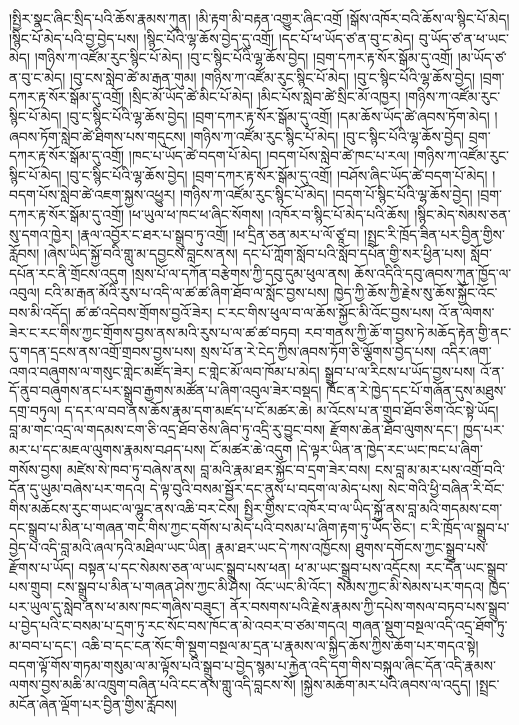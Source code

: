 \documentclass{article}
\begin{document}
།སྤྱིར་སྣང་ཞིང་སྲིད་པའི་ཆོས་རྣམས་ཀུན། །མི་རྟག་མི་བརྟན་འགྱུར་ཞིང་འགྲོ །སྒོས་འཁོར་བའི་ཆོས་ལ་སྙིང་པོ་མེད། །སྙིང་པོ་མེད་པའི་བྱ་བྱེད་པས། །སྙིང་པོའི་ལྷ་ཆོས་བྱེད་དུ་འགྲོ། །དང་པོ་ཕ་ཡོད་ཙ་ན་བུ་ང་མེད། བུ་ཡོད་ཙ་ན་ཕ་ཡང་མེད། །གཉིས་ཀ་འཛོམ་རུང་སྙིང་པོ་མེད། །བུ་ང་སྙིང་པོའི་ལྷ་ཆོས་བྱེད། །བྲག་དཀར་རྟ་སོར་སྒོམ་དུ་འགྲོ། །མ་ཡོད་ཙ་ན་བུ་ང་མེད། །བུ་ངས་སླེབ་ཚེ་མ་རྒན་གུམ། །གཉིས་ཀ་འཛོམ་རུང་སྙིང་པོ་མེད། །བུ་ང་སྙིང་པོའི་ལྷ་ཆོས་བྱེད། །བྲག་དཀར་རྟ་སོར་སྒོམ་དུ་འགྲོ། །སྲིང་མོ་ཡོད་ཚེ་མིང་པོ་མེད། །མིང་པོས་སླེབ་ཚེ་སྲིང་མོ་འཁྱར། །གཉིས་ཀ་འཛོམ་རུང་སྙིང་པོ་མེད། །བུ་ང་སྙིང་པོའི་ལྷ་ཆོས་བྱེད། །བྲག་དཀར་རྟ་སོར་སྒོམ་དུ་འགྲོ། །དམ་ཆོས་ཡོད་ཚེ་ཞབས་ཏོག་མེད། །ཞབས་ཏོག་སླེབ་ཚེ་ཐིགས་པས་གདུངས། །གཉིས་ཀ་འཛོམ་རུང་སྙིང་པོ་མེད། །བུ་ང་སྙིང་པོའི་ལྷ་ཆོས་བྱེད། བྲག་དཀར་རྟ་སོར་སྒོམ་དུ་འགྲོ། །ཁང་པ་ཡོད་ཚེ་བདག་པོ་མེད། །བདག་པོས་སླེབ་ཚེ་ཁང་པ་རལ། །གཉིས་ཀ་འཛོམ་རུང་སྙིང་པོ་མེད། །བུ་ང་སྙིང་པོའི་ལྷ་ཆོས་བྱེད། །བྲག་དཀར་རྟ་སོར་སྒོམ་དུ་འགྲོ། །བཤོས་ཞིང་ཡོད་ཚེ་བདག་པོ་མེད། །བདག་པོས་སླེབ་ཚེ་འཇག་སྐྱས་འཕྱུར། །གཉིས་ཀ་འཛོམ་རུང་སྙིང་པོ་མེད། །བདག་པོ་སྙིང་པོའི་ལྷ་ཆོས་བྱེད། །བྲག་དཀར་རྟ་སོར་སྒོམ་དུ་འགྲོ། །ཕ་ཡུལ་ཕ་ཁང་ཕ་ཞིང་སོགས། །འཁོར་བ་སྙིང་པོ་མེད་པའི་ཆོས། །སྙིང་མེད་སེམས་ཅན་སུ་དགའ་ཁྱེར། །རྣལ་འབྱོར་ང་ཐར་པ་སྒྲུབ་ཏུ་འགྲོ། །ཕ་དྲིན་ཅན་མར་པ་ལོ་ཙཱ་བ། །སྤྲང་རི་ཁྲོད་ཟིན་པར་བྱིན་གྱིས་རློབས། །ཞེས་ཡིད་སྐྱོ་བའི་གླུ་མ་དབྱངས་བླངས་ནས། དང་པོ་ཀློག་སློབ་པའི་སློབ་དཔོན་གྱི་སར་ཕྱིན་པས། སློབ་དཔོན་རང་ནི་གྲོངས་འདུག །སྲས་པོ་ལ་དཀོན་བརྩེགས་ཀྱི་དབུ་དུམ་ཕུལ་ནས། ཆོས་འདིའི་དབུ་ཞབས་ཀུན་ཁྱོད་ལ་འབུལ། ངའི་མ་རྒན་མོའི་རུས་པ་འདི་ལ་ཚ་ཚ་ཞིག་ཐོབ་ལ་སློང་བྱས་པས། ཁྱེད་ཀྱི་ཆོས་ཀྱི་རྗེས་སུ་ཆོས་སྐྱོང་འོང་བས་མི་འདོད། ཚ་ཚ་འདེབས་གྲོགས་བྱའོ་ཟེར། ང་རང་གིས་ཕུལ་བ་ལ་ཆོས་སྐྱོང་མི་འོང་བྱས་པས། འོ་ན་ལེགས་ཟེར་ང་རང་གིས་ཀྱང་གྲོགས་བྱས་ནས་མའི་རུས་པ་ལ་ཚ་ཚ་བཏབ། རབ་གནས་ཀྱི་ཆོ་ག་བྱས་ཏེ་མཆོད་རྟེན་གྱི་ནང་དུ་གདན་དྲངས་ནས་འགྲོ་གྲབས་བྱས་པས། སྲས་པོ་ན་རེ་ངེད་ཀྱིས་ཞབས་ཏོག་ཅི་ལྕོགས་བྱེད་པས། འདིར་ཞག་འགའ་བཞུགས་ལ་གསུང་གླེང་མཛོད་ཟེར། ང་གླེང་མོ་ལབ་ཁོམ་པ་མེད། སྒྲུབ་པ་ལ་རིངས་པ་ཡོད་བྱས་པས། འོ་ན་དོ་ནུབ་བཞུགས་ནང་པར་སྒྲུབ་རྒྱགས་མཚོན་པ་ཞིག་འབུལ་ཟེར་བསྡད། ཁོང་ན་རེ་ཁྱེད་དང་པོ་གཞོན་དུས་མཐུས་དགྲ་བཏུལ། ད་དར་ལ་བབ་ནས་ཆོས་རྣམ་དག་མཛད་པ་ངོ་མཚར་ཆེ། མ་འོངས་པ་ན་གྲུབ་ཐོབ་ཅིག་འོང་སྟེ་ཡོད། བླ་མ་གང་འདྲ་ལ་གདམས་ངག་ཅི་འདྲ་ཐོབ་ཅེས་ཞིབ་ཏུ་འདྲི་རུ་བྱུང་བས། རྫོགས་ཆེན་ཐོབ་ལུགས་དང་། ཁྱད་པར་མར་པ་དང་མཇལ་ལུགས་རྣམས་བཤད་པས། ངོ་མཚར་ཆེ་འདུག །དེ་ལྟར་ཡིན་ན་ཁྱེད་རང་ཡང་ཁང་པ་ཞིག་གསོས་བྱས། མཛེས་སེ་ཁབ་ཏུ་བཞེས་ནས། བླ་མའི་རྣམ་ཐར་སྐྱོང་བ་དྲག་ཟེར་བས། ངས་བླ་མ་མར་པས་འགྲོ་བའི་དོན་དུ་ཡུམ་བཞེས་པར་གདའ། དེ་ལྟ་བུའི་བསམ་སྦྱོར་དང་ནུས་པ་བདག་ལ་མེད་པས། སེང་གེའི་ཕྱི་བཞིན་རི་བོང་གིས་མཆོངས་རུང་གཡང་ལ་ལྷུང་ནས་འཆི་བར་ངེས། སྤྱིར་གྱིས་ང་འཁོར་བ་ལ་ཡིད་སྐྱོ་ནས་བླ་མའི་གདམས་ངག་དང་སྒྲུབ་པ་མིན་པ་གཞན་གང་གིས་ཀྱང་དགོས་པ་མེད་པའི་བསམ་པ་ཞིག་རྟག་ཏུ་ཡོད་ཅིང་། ང་རི་ཁྲོད་ལ་སྒྲུབ་པ་བྱེད་པ་འདི་བླ་མའི་ཞལ་ཏའི་མཐིལ་ཡང་ཡིན། རྣམ་ཐར་ཡང་དེ་ཀས་འཁྱོངས། ཐུགས་དགོངས་ཀྱང་སྒྲུབ་པས་རྫོགས་པ་ཡོད། བསྟན་པ་དང་སེམས་ཅན་ལ་ཡང་སྒྲུབ་པས་ཕན། ཕ་མ་ཡང་སྒྲུབ་པས་འདྲོངས། རང་དོན་ཡང་སྒྲུབ་པས་གྲུབ། ངས་སྒྲུབ་པ་མིན་པ་གཞན་ཤེས་ཀྱང་མི་ཤེས། འོང་ཡང་མི་འོང་། སེམས་ཀྱང་མི་སེམས་པར་གདའ། ཁྱད་པར་ཡུལ་དུ་སླེབ་ནས་ཕ་མས་ཁང་གཞིས་བཟུང་། ནོར་བསགས་པའི་རྗེས་རྣམས་ཀྱི་དཔེས་གསལ་བཏབ་པས་སྒྲུབ་པ་བྱེད་པའི་ང་བསམ་པ་དྲག་ཏུ་རང་སོང་བས་ཁོང་ན་མེ་འབར་བ་ཙམ་གདའ། གཞན་སྡུག་བསྔལ་འདི་འདྲ་ཐོག་ཏུ་མ་བབ་པ་དང་། འཆི་བ་དང་ངན་སོང་གི་སྡུག་བསྔལ་མ་དྲན་པ་རྣམས་ལ་སྐྱིད་ཆོས་ཀྱིས་ཆོག་པར་གདའ་སྟེ། བདག་ལྟོ་གོས་གཏམ་གསུམ་ལ་མ་ལྟོས་པའི་སྒྲུབ་པ་བྱེད་སྙམ་པ་རྐྱེན་འདི་དག་གིས་བསྐུལ་ཞིང་དོན་འདི་རྣམས་ལགས་བྱས་མཆི་མ་འཁྲུག་བཞིན་པའི་ངང་ནས་གླུ་འདི་བླངས་སོ། །སྐྱེས་མཆོག་མར་པའི་ཞབས་ལ་འདུད། །སྤྲང་མངོན་ཞེན་ལྡོག་པར་བྱིན་གྱིས་རློབས། 
\end{document}
